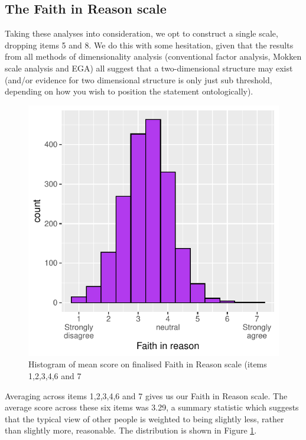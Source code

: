 \documentclass[
  ,jou,floatsintext]{apa6}
\begin{document}
\hypertarget{the-faith-in-reason-scale}{%
\subsection{The Faith in Reason scale}\label{the-faith-in-reason-scale}}

Taking these analyses into consideration, we opt to construct a single scale, dropping items 5 and 8. We do this with some hesitation, given that the results from all methods of dimensionality analysis (conventional factor analysis, Mokken scale analysis and EGA) all suggest that a two-dimensional structure may exist (and/or evidence for two dimensional structure is only just sub threshold, depending on how you wish to position the statement ontologically).

\begin{figure}

{\centering \includegraphics[width=0.75\linewidth]{faithinreason_files/figure-latex/meanhistogram-1} 

}

\caption{Histogram of mean score on finalised Faith in Reason scale (items 1,2,3,4,6 and 7}\label{fig:meanhistogram}
\end{figure}

Averaging across items 1,2,3,4,6 and 7 gives us our Faith in Reason scale. The average score across these six items was 3.29, a summary statistic which suggests that the typical view of other people is weighted to being slightly less, rather than slightly more, reasonable. The distribution is shown in Figure \ref{fig:meanhistogram}.
\end{document}
